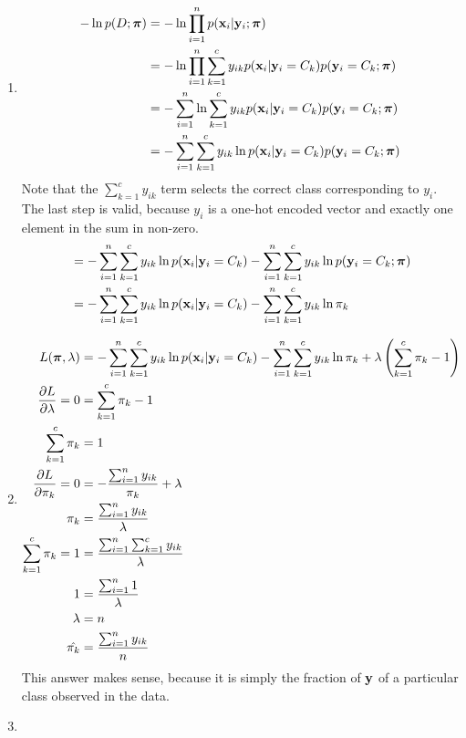 \documentclass[submit]{harvardml}
\begin{document}
\begin{solution}
\begin{sol}
\begin{enumerate}
\item
\begin{align*}
-\ln p(D ; \boldsymbol{\pi}) &= -\ln \prod_{i=1}^n p(\mathbf{x}_i | \mathbf{y}_i ; \boldsymbol{\pi})\\
&= -\ln \prod_{i=1}^n \sum_{k=1}^c y_{ik} p(\mathbf{x}_i | \mathbf{y}_i = C_k) p(\mathbf{y}_i = C_k; \boldsymbol{\pi})\\
&= - \sum_{i=1}^n \ln \sum_{k=1}^c y_{ik} p(\mathbf{x}_i | \mathbf{y}_i = C_k) p(\mathbf{y}_i = C_k; \boldsymbol{\pi})\\
&= - \sum_{i=1}^n \sum_{k=1}^c y_{ik} \ln p(\mathbf{x}_i | \mathbf{y}_i = C_k) p(\mathbf{y}_i = C_k; \boldsymbol{\pi})
\end{align*}
Note that the $\sum_{k=1}^c y_{ik}$ term selects the correct class corresponding to $y_i$.
The last step is valid, because $y_i$ is a one-hot encoded vector and exactly one element in the sum in non-zero.
\begin{align*}
&= - \sum_{i=1}^n \sum_{k=1}^c y_{ik} \ln p(\mathbf{x}_i | \mathbf{y}_i = C_k)
- \sum_{i=1}^n \sum_{k=1}^c y_{ik} \ln p(\mathbf{y}_i = C_k; \boldsymbol{\pi})\\
&= - \sum_{i=1}^n \sum_{k=1}^c y_{ik} \ln p(\mathbf{x}_i | \mathbf{y}_i = C_k)
- \sum_{i=1}^n \sum_{k=1}^c y_{ik} \ln \pi_k
\end{align*}
%
\item
\begin{align*}
L(\boldsymbol{\pi}, \lambda) &= - \sum_{i=1}^n \sum_{k=1}^c y_{ik} \ln p(\mathbf{x}_i | \mathbf{y}_i = C_k)
- \sum_{i=1}^n \sum_{k=1}^c y_{ik} \ln \pi_k
+ \lambda \left( \sum_{k=1}^c \pi_k - 1 \right)\\
\frac{\partial L}{\partial \lambda} = 0 &= \sum_{k=1}^c \pi_k - 1\\
\sum_{k=1}^c \pi_k &= 1\\
\frac{\partial L}{\partial \pi_k} = 0 &= - \frac{\sum_{i=1}^n y_{ik}}{\pi_k} + \lambda\\
\pi_k &= \frac{\sum_{i=1}^n y_{ik}}{\lambda}\\
\sum_{k=1}^c \pi_k = 1 &= \frac{\sum_{i=1}^n \sum_{k=1}^c y_{ik}}{\lambda}\\
1 &= \frac{\sum_{i=1}^n 1}{\lambda}\\
\lambda &= n\\
\hat{\pi_k} &= \frac{\sum_{i=1}^n y_{ik}}{n}
\end{align*}
This answer makes sense, because it is simply the fraction of $\mathbf{y}$ of a particular class observed in the data.
%
\item

\end{enumerate}
\end{sol}
\end{solution}
\end{document}
